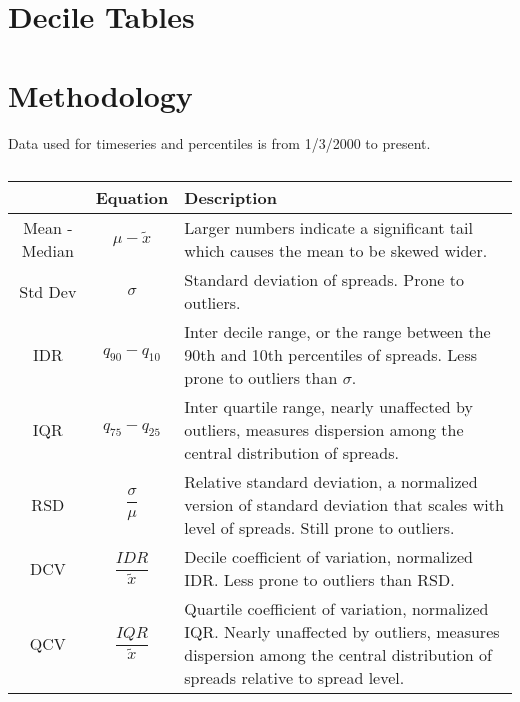 \documentclass[12pt]{article}
\begin{document}
\section{Decile Tables}

\pagebreak
\section{Methodology}
Data used for timeseries and percentiles is from 1/3/2000 to present.\bigskip

\begin{table}[H]
	\caption{}
	\centering
	\begin{tabu} to 
		\toprule
		{} &      Equation  &        Description \\
		\midrule
		Mean - Median      &  $\mu - \tilde{x}$ &  Larger numbers indicate a significant tail which causes the mean to be skewed wider. \\
			\midrule
		Std Dev        &  $\sigma$ & Standard deviation of spreads. Prone to outliers. \\
			\midrule
		IDR       &  $q_{90} - q_{10}$ & Inter decile range, or the range between the 90th and 10th percentiles of spreads. Less
		prone to outliers than $\sigma$. \\
			\midrule
		IQR       &  $q_{75} - q_{25}$ & Inter quartile range, nearly unaffected by outliers, measures dispersion among the central
		distribution of spreads.\\
			\midrule
		RSD      & $\dfrac{\sigma}{\mu}$ & Relative standard deviation, a normalized version of standard deviation that scales
		with level of spreads. Still prone to outliers.   \\
			\midrule
		DCV      & $\dfrac{IDR}{\tilde{x}}$ & Decile coefficient of variation, normalized IDR. Less prone to outliers than RSD.   \\
			\midrule
		QCV      & $\dfrac{IQR}{\tilde{x}}$ & Quartile coefficient of variation, normalized IQR. Nearly unaffected by outliers, 
		measures dispersion among the central distribution of spreads relative to spread level.   \\
		\bottomrule
	\end{tabu}
\end{table}
\end{document}
